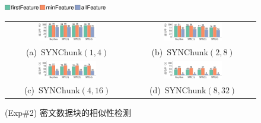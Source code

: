 \begin{figure}[!htb]
    \centering
    \includegraphics[width=0.4\textwidth]{pic/featurespy/plot/detection/syn/synBarPlotDetect_legend.pdf}\\
    \begin{tabular}{@{}c@{}c}
        \includegraphics[width=0.49\textwidth]{pic/featurespy/plot/detection/syn/syn-p1-q4-detect.pdf}  &
        \includegraphics[width=0.49\textwidth]{pic/featurespy/plot/detection/syn/syn-p2-q8-detect.pdf}    \\
        \mbox{\small (a) $\textrm{SYNChunk}(1, 4)$}                                                     &
        \mbox{\small (b) $\textrm{SYNChunk}(2, 8)$}                                                       \\
        \includegraphics[width=0.49\textwidth]{pic/featurespy/plot/detection/syn/syn-p4-q16-detect.pdf} &
        \includegraphics[width=0.49\textwidth]{pic/featurespy/plot/detection/syn/syn-p8-q32-detect.pdf}   \\
        \mbox{\small (c) $\textrm{SYNChunk}(4, 16)$}                                                    &
        \mbox{\small (d) $\textrm{SYNChunk}(8, 32)$}                                                      \\
    \end{tabular}
    \caption{(Exp\#2) 密文数据块的相似性检测}
    \label{fig:featurespy-expDetectionSynDetect}
\end{figure}

